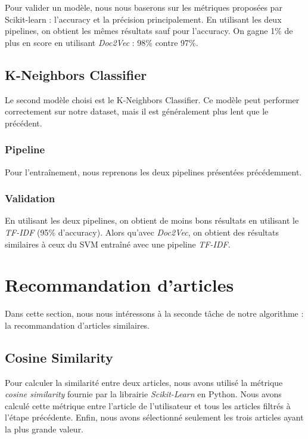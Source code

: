 \documentclass[a4paper,12pt]{article}
\begin{document}
Pour valider un modèle, nous nous baserons sur les métriques proposées par Scikit-learn : l'accuracy et la précision principalement. En utilisant les deux pipelines, on obtient les mêmes résultats sauf pour l'accuracy. On gagne 1\% de plus en score en utilisant \textit{Doc2Vec} : 98\% contre 97\%.

\subsection{K-Neighbors Classifier}

Le second modèle choisi est le K-Neighbors Classifier. Ce modèle peut performer correctement sur notre dataset, mais il est généralement plus lent que le précédent.

\subsubsection{Pipeline}

Pour l'entraînement, nous reprenons les deux pipelines présentées précédemment.

\subsubsection{Validation}

En utilisant les deux pipelines, on obtient de moins bons résultats en utilisant le \textit{TF-IDF} (95\% d'accuracy). Alors qu'avec \textit{Doc2Vec}, on obtient des résultats similaires à ceux du SVM entraîné avec une pipeline \textit{TF-IDF}.

\section{Recommandation d'articles}

Dans cette section, nous nous intéressons à la seconde tâche de notre algorithme : la recommandation d'articles similaires.

\subsection{Cosine Similarity}

Pour calculer la similarité entre deux articles, nous avons utilisé la métrique \textit{cosine similarity} fournie par la librairie \textit{Scikit-Learn} en Python. Nous avons calculé cette métrique entre l'article de l'utilisateur et tous les articles filtrés à l'étape précédente. Enfin, nous avons sélectionné seulement les trois articles ayant la plus grande valeur.\\
\end{document}
